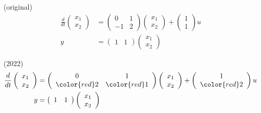 (original)
\begin{align*}
	\frac{d}{dt}
	\left (
	\begin{array}{c}
	 x_1 \\ x_2 
	\end{array}
	\right )
	& = 
	\left (
	\begin{array}{cc}
	 0 & 1 \\
	 -1 & 2
	\end{array}
	\right )
	\left (
	\begin{array}{c}
	 x_1 \\ x_2 
	\end{array}
	\right )
	+
	\left (
	\begin{array}{c}
	 1 \\ 1 
	\end{array}
	\right )
	u
\\
	y 
	&=
	\left (
	\begin{array}{cc}
	 1 & 1  
	\end{array}
	\right )
	\left (
	\begin{array}{c}
	 x_1 \\ x_2 
	\end{array}
	\right )
\end{align*}

(2022)
\begin{align*}
	\frac{d}{dt}
	\left (
	\begin{array}{c}
	 x_1 \\ x_2 
	\end{array}
	\right )
	& = 
	\left (
	\begin{array}{cc}
	 0 & 1 \\
	 \color{red} 2 & \color{red} 1
	\end{array}
	\right )
	\left (
	\begin{array}{c}
	 x_1 \\ x_2 
	\end{array}
	\right )
	+
	\left (
	\begin{array}{c}
	 1 \\ \color{red} 2
	\end{array}
	\right )
	u
\\
	y 
	&=
	\left (
	\begin{array}{cc}
	 1 & 1  
	\end{array}
	\right )
	\left (
	\begin{array}{c}
	 x_1 \\ x_2 
	\end{array}
	\right )
\end{align*}

